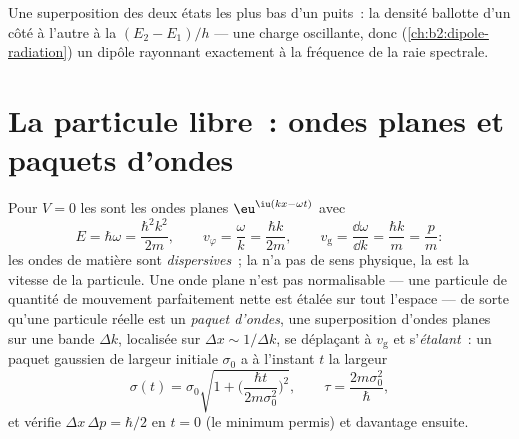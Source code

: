\begin{omfigure}

{\small Une superposition des deux états les plus bas d'un puits~: la
densité ballotte d'un côté à l'autre à la 
$(E_2 - E_1)/h$ --- une charge oscillante, donc (\cref{ch:b2:dipole-radiation})
un dipôle rayonnant exactement à la fréquence de la raie spectrale.}
\end{omfigure}

\section{La particule libre~: ondes planes et paquets d'ondes}

\begin{proposition}\label{prop:b2:schrodinger-wave-functions:free}
Pour $V = 0$ les  sont les ondes planes $\eu^{\iu(kx -
\omega t)}$ avec
\[
E = \hbar\omega = \frac{\hbar^2k^2}{2m}, \qquad
v_\varphi = \frac{\omega}{k} = \frac{\hbar k}{2m}, \qquad
v_{\text{g}} = \frac{\dd\omega}{\dd k} = \frac{\hbar k}{m} = \frac{p}{m} :
\]
les ondes de matière sont \emph{dispersives}~; la  n'a pas de sens
physique, la \emph{} est la vitesse de la particule. Une onde
plane n'est pas normalisable --- une particule de quantité de mouvement parfaitement nette est
étalée sur tout l'espace --- de sorte qu'une particule réelle est un \emph{paquet
d'ondes}, une superposition d'ondes planes sur une bande
$\Delta k$, localisée sur $\Delta x \sim 1/\Delta k$, se déplaçant à $v_{\text{g}}$ et
s'\emph{étalant}~: un paquet gaussien de largeur initiale $\sigma_0$ a à
l'instant $t$ la largeur
\[
\sigma(t) = \sigma_0\sqrt{1 + \Big(\frac{\hbar t}{2m\sigma_0^2}\Big)^2}, \qquad
\tau = \frac{2m\sigma_0^2}{\hbar} ,
\]
et vérifie $\Delta x\,\Delta p = \hbar/2$ en $t = 0$ (le minimum permis)
et davantage ensuite.
\end{proposition}


